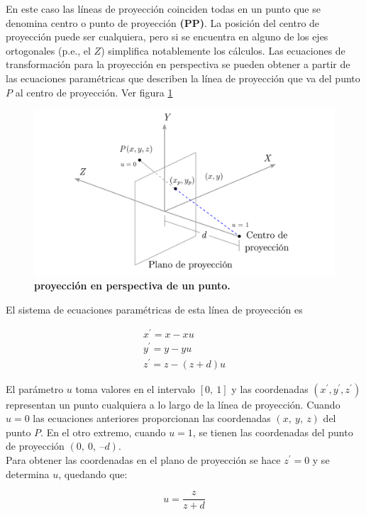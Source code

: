 En este caso las líneas de proyección coinciden todas en un punto que se denomina centro o punto de proyección \textbf{(PP)}. La posición del centro de proyección puede ser cualquiera, pero si se encuentra en alguno de los ejes ortogonales (p.e., el $Z$) simplifica notablemente los cálculos.
Las ecuaciones de transformación para la proyección en perspectiva se pueden obtener a partir de las ecuaciones paramétricas que describen la línea de proyección que va del punto $P$ al centro de proyección. Ver figura \ref{geo-per7}

\begin{figure}[h]
    \includegraphics[width=12cm]{Img/GEO/geo-per-7.png}
    \centering
    \caption{\footnotesize{\textbf{proyección en perspectiva de un punto.}}}
    \label{geo-per7}
\end{figure}

El sistema de ecuaciones paramétricas de esta línea de proyección es

\begin{align*} 
x^{\prime} = x - xu \\
\nonumber
y^{\prime} = y - yu \\
\nonumber
z^{\prime} = z - (z+d)u
\end{align*}

El parámetro $u$ toma valores en el intervalo $[0, \ 1]$ y las coordenadas $(x^{\prime},y^{\prime}, z^{\prime})$ representan un punto cualquiera a lo largo de la línea de proyección. Cuando $u = 0$ las ecuaciones anteriores proporcionan las coordenadas $(x, \ y, \ z)$ del punto $P$. En el otro extremo, cuando $u = 1$, se tienen las coordenadas del punto de proyección $(0, \ 0, \ –d)$.\\
Para obtener las coordenadas en el plano de proyección se hace $z^{\prime} = 0$ y se determina $u$, quedando que:

$$u = \frac{z}{z + d}$$

